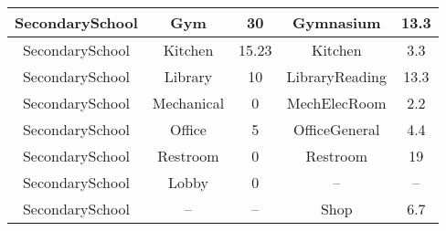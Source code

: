 \begin{table}
\begin{tabular}{|c|c|c|c|c|}
SecondarySchool        & Gym                     & 30                                                                                                            & Gymnasium                & 13.3                                                                                                           \\ \hline
SecondarySchool        & Kitchen                 & 15.23                                                                                                         & Kitchen                  & 3.3                                                                                                            \\ \hline
SecondarySchool        & Library                 & 10                                                                                                            & LibraryReading           & 13.3                                                                                                           \\ \hline
SecondarySchool        & Mechanical              & 0                                                                                                             & MechElecRoom             & 2.2                                                                                                            \\ \hline
SecondarySchool        & Office                  & 5                                                                                                             & OfficeGeneral            & 4.4                                                                                                            \\ \hline
SecondarySchool        & Restroom                & 0                                                                                                             & Restroom                 & 19                                                                                                             \\ \hline
SecondarySchool        & Lobby                   & 0                                                                                                             & --                       & --                                                                                                             \\ \hline
SecondarySchool        & --                      & --                                                                                                            & Shop                     & 6.7                                                                                                            \\ \hline

\end{tabular}
\end{table}
